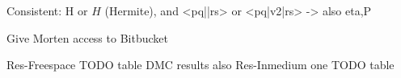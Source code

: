  
Consistent: H or $\hat{H}$ (Hermite), and <pq||rs> or <pq|v2|rs> -> also eta,P

Give Morten access to Bitbucket

Res-Freespace TODO table
DMC results also Res-Inmedium one TODO table



